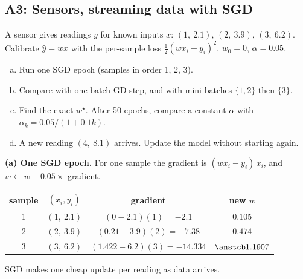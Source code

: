 \subsection{A3: Sensors, streaming data with SGD}

\begin{frame}{}
  \begin{probbox}
    A sensor gives readings $y$ for known inputs $x$: $(1,\ 2.1)$, $(2,\ 3.9)$, $(3,\ 6.2)$.
    Calibrate $\hat y = w x$ with the per-sample loss $\tfrac12(wx_i - y_i)^2$, $w_0 = 0$, $\alpha = 0.05$.
    \begin{enumerate}[(a)]
      \item Run one SGD epoch (samples in order 1, 2, 3).
      \item Compare with one batch GD step, and with mini-batches $\{1,2\}$ then $\{3\}$.
      \item Find the exact $w^\star$. After 50 epochs, compare a constant $\alpha$ with $\alpha_k = 0.05/(1 + 0.1k)$.
      \item A new reading $(4,\ 8.1)$ arrives. Update the model without starting again.
    \end{enumerate}
  \end{probbox}
\end{frame}

\begin{frame}{}
  \textbf{(a) One SGD epoch.} For one sample the gradient is $(wx_i - y_i)\,x_i$, and $w \leftarrow w - 0.05\times$ gradient.
  \begin{center}\small
  \begin{tabular}{@{}c c c c@{}}
    \toprule
    sample & $(x_i, y_i)$ & gradient & new $w$ \\
    \midrule
    1 & $(1,\ 2.1)$ & $(0 - 2.1)(1) = -2.1$ & $0.105$ \\
    2 & $(2,\ 3.9)$ & $(0.21 - 3.9)(2) = -7.38$ & $0.474$ \\
    3 & $(3,\ 6.2)$ & $(1.422 - 6.2)(3) = -14.334$ & $\ans{1.1907}$ \\
    \bottomrule
  \end{tabular}
  \end{center}
  SGD makes one cheap update per reading as data arrives.
\end{frame}

